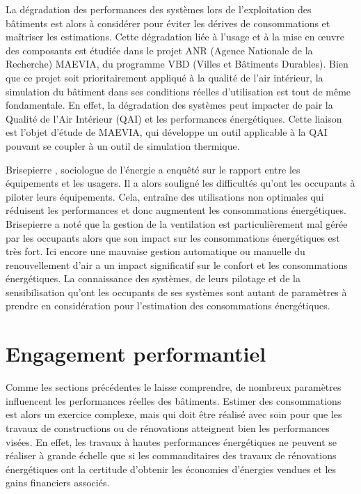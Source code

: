La dégradation des performances des systèmes lors de l'exploitation des bâtiments est alors à considérer pour éviter les dérives de consommations et maîtriser les estimations. Cette dégradation liée à l'usage et à la mise en œuvre des composants est étudiée dans le projet ANR (Agence Nationale de la Recherche) MAEVIA, du programme VBD (Villes et Bâtiments Durables). Bien que ce projet soit prioritairement appliqué à la qualité de l'air intérieur, la simulation du bâtiment dans ses conditions réelles d'utilisation est tout de même fondamentale. En effet, la dégradation des systèmes peut impacter de pair la Qualité de l'Air Intérieur (QAI) et les performances énergétiques. Cette liaison est l'objet d'étude de MAEVIA, qui développe un outil applicable à la QAI pouvant se coupler à un outil de simulation thermique.

Brisepierre \cite{Brisepierre-11}, sociologue de l'énergie a enquêté sur le rapport entre les équipements et les usagers. Il a alors souligné les difficultés qu'ont les occupants à piloter leurs équipements. Cela, entraîne des utilisations non optimales qui réduisent les performances et donc augmentent les consommations énergétiques. Brisepierre a noté que la gestion de la ventilation est particulièrement mal gérée par les occupants alors que son impact sur les consommations énergétiques est très fort. Ici encore une mauvaise gestion automatique ou manuelle du renouvellement d'air a un impact significatif sur le confort et les consommations énergétiques. La connaissance des systèmes, de leurs pilotage et de la sensibilisation qu'ont les occupants de ses systèmes sont autant de paramètres à prendre en considération pour l'estimation des consommations énergétiques. 

\section{Engagement performantiel}

Comme les sections précédentes le laisse comprendre, de nombreux paramètres influencent les performances réelles des bâtiments. Estimer des consommations est alors un exercice complexe, mais qui doit être réalisé avec soin pour que les travaux de constructions ou de rénovations atteignent bien les performances visées. En effet, les travaux à hautes performances énergétiques ne peuvent se réaliser à grande échelle que si les commanditaires des travaux de rénovations énergétiques ont la certitude d'obtenir les économies d'énergies vendues et les gains financiers associés.

